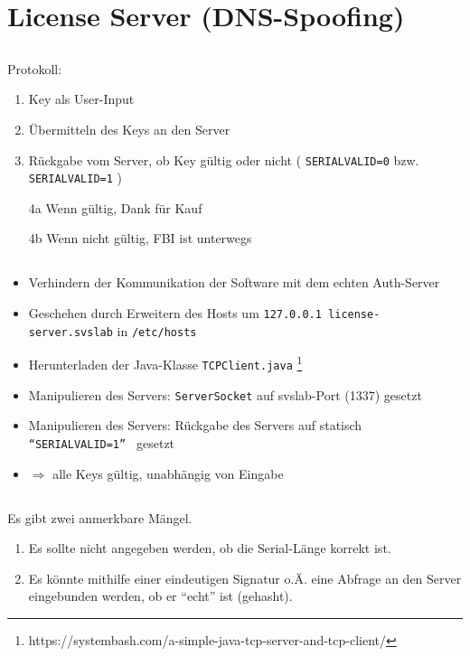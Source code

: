\documentclass[twoside]{article}
\newcommand{\say}[1]{%
	``#1''%
}
\newcommand{\ttt}[1]{%
	\texttt{#1}%
}
\begin{document}
\section{License Server (DNS-Spoofing)}
\subsection{}
Protokoll:
\begin{enumerate}
	\item Key als User-Input
	\item Übermitteln des Keys an den Server
	\item Rückgabe vom Server, ob Key gültig oder nicht (\ttt{SERIAL\textunderscore VALID=0} bzw. \ttt{SERIAL\textunderscore VALID=1})
	\item[4a] Wenn gültig, Dank für Kauf
	\item[4b] Wenn nicht gültig, FBI ist unterwegs
\end{enumerate}
\subsection{}
\begin{itemize}
	\item Verhindern der Kommunikation der Software mit dem echten Auth-Server
	\item Geschehen durch Erweitern des Hosts um \ttt{127.0.0.1    license-server.svslab} in \ttt{/etc/hosts}
	\item Herunterladen der Java-Klasse \ttt{TCPClient.java}\footnote{https://systembash.com/a-simple-java-tcp-server-and-tcp-client/}
	\item Manipulieren des Servers: \ttt{ServerSocket} auf svslab-Port (1337) gesetzt
	\item Manipulieren des Servers: Rückgabe des Servers auf statisch \ttt{\say{SERIAL\textunderscore VALID=1}} gesetzt
	\item $\Longrightarrow$ alle Keys gültig, unabhängig von Eingabe
\end{itemize} 
\subsection{}
Es gibt zwei anmerkbare Mängel.
\begin{enumerate}
	\item Es sollte nicht angegeben werden, ob die Serial-Länge korrekt ist.
	\item Es könnte mithilfe einer eindeutigen Signatur o.Ä. eine Abfrage an den Server eingebunden werden, ob er \say{echt} ist (gehasht).
\end{enumerate}
\end{document}

